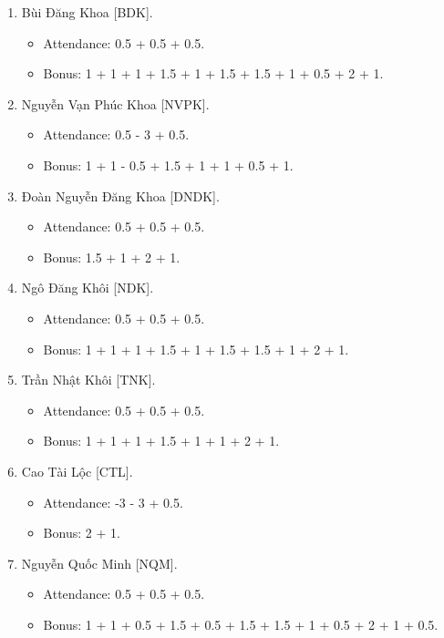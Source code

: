 \documentclass{article}
\begin{document}
\begin{enumerate}
\begin{itemize}
    \end{itemize}
    \item {\sc Bùi Đăng Khoa [BDK].}
    \begin{itemize}
        \item Attendance: 0.5 + 0.5 + 0.5.
        \item Bonus: 1 + 1 + 1 + 1.5 + 1 + 1.5 + 1.5 + 1 + 0.5 + 2 + 1.
    \end{itemize}
    \item {\sc Nguyễn Vạn Phúc Khoa [NVPK].}
    \begin{itemize}
        \item Attendance: 0.5 - 3 + 0.5.
        \item Bonus: 1 + 1 - 0.5 + 1.5 + 1 + 1 + 0.5 + 1.
    \end{itemize}
    \item {\sc Đoàn Nguyễn Đăng Khoa [DNDK].}
    \begin{itemize}
        \item Attendance: 0.5 + 0.5 + 0.5.
        \item Bonus: 1.5 + 1 + 2 + 1.
    \end{itemize}
    \item {\sc Ngô Đăng Khôi [NDK].}
    \begin{itemize}
        \item Attendance: 0.5 + 0.5 + 0.5.
        \item Bonus: 1 + 1 + 1 + 1.5 + 1 + 1.5 + 1.5 + 1 + 2 + 1.
    \end{itemize}
    \item {\sc Trần Nhật Khôi [TNK].}
    \begin{itemize}
        \item Attendance: 0.5 + 0.5 + 0.5.
        \item Bonus: 1 + 1 + 1 + 1.5 + 1 + 1 + 2 + 1.
    \end{itemize}
    \item {\sc Cao Tài Lộc [CTL].}
    \begin{itemize}
        \item Attendance: -3 - 3 + 0.5.
        \item Bonus: 2 + 1.
    \end{itemize}
    \item {\sc Nguyễn Quốc Minh [NQM].}
    \begin{itemize}
        \item Attendance: 0.5 + 0.5 + 0.5.
        \item Bonus: 1 + 1 + 0.5 + 1.5 + 0.5 + 1.5 + 1.5 + 1 + 0.5 + 2 + 1 + 0.5.

\end{itemize}
\end{enumerate}
\end{document}
